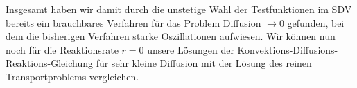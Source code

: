 \begin{figure}[H]
\end{figure}

Insgesamt haben wir damit durch die unstetige Wahl der Testfunktionen im SDV bereits ein brauchbares Verfahren für das Problem Diffusion $\to 0$ gefunden, bei dem die bisherigen Verfahren  starke Oszillationen aufwiesen. 
Wir können nun noch für die Reaktionsrate $r=0$ unsere Lösungen der Konvektions-Diffusions-Reaktions-Gleichung für sehr kleine Diffusion mit der Lösung des reinen Transportproblems vergleichen.

